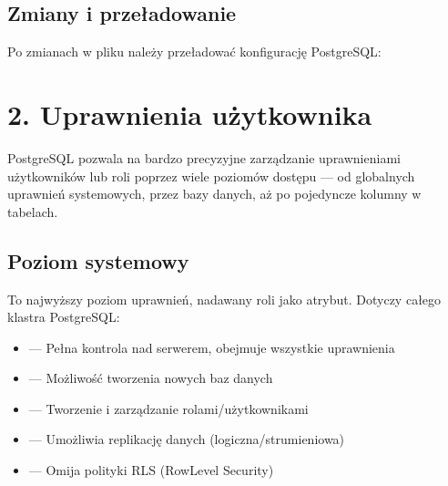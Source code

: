 \documentclass[a4paper,11pt,polish]{sphinxmanual}
\begin{document}
\subsection{Zmiany i przeładowanie}
\label{\detokenize{Bezpieczenstwo/index:zmiany-i-przeladowanie}}
\sphinxAtStartPar
Po zmianach w pliku należy przeładować konfigurację PostgreSQL:

\begin{sphinxVerbatim}[commandchars=\\\{\}]
 
 
 
\end{sphinxVerbatim}


\section{2. Uprawnienia użytkownika}
\label{\detokenize{Bezpieczenstwo/index:uprawnienia-uzytkownika}}
\sphinxAtStartPar
PostgreSQL pozwala na bardzo precyzyjne zarządzanie uprawnieniami użytkowników lub roli poprzez wiele poziomów dostępu — od globalnych uprawnień systemowych, przez bazy danych, aż po pojedyncze kolumny w tabelach.


\subsection{Poziom systemowy}
\label{\detokenize{Bezpieczenstwo/index:poziom-systemowy}}
\sphinxAtStartPar
To najwyższy poziom uprawnień, nadawany roli jako atrybut. Dotyczy całego klastra PostgreSQL:
\begin{itemize}
\item {} 
\sphinxAtStartPar
{} — Pełna kontrola nad serwerem, obejmuje wszystkie uprawnienia

\item {} 
\sphinxAtStartPar
{} — Możliwość tworzenia nowych baz danych

\item {} 
\sphinxAtStartPar
{} — Tworzenie i zarządzanie rolami/użytkownikami

\item {} 
\sphinxAtStartPar
{} — Umożliwia replikację danych (logiczna/strumieniowa)

\item {} 
\sphinxAtStartPar
{} — Omija polityki RLS (Row\sphinxhyphen{}Level Security)

\end{itemize}
\end{document}
